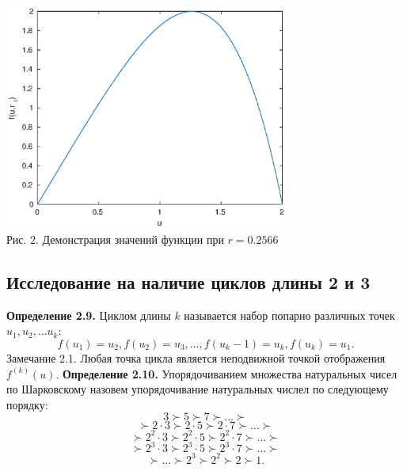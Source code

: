 \documentclass[11pt]{article}
\begin{document}
	\begin{center}
		\includegraphics[width=0.7\textwidth]{lim_r.eps}\\
		{Рис. 2. Демонстрация значений функции при $r = 0.2566$}
	\end{center}
	{\subsection{Исследование на наличие циклов длины 2 и 3}}
	{\textbf{Определение 2.9.} Циклом длины $k$ называется набор попарно различных точек $u_1, u_2,\ldots u_k:$}
	\[f(u_1) = u_2, f(u_2) = u_3, \ldots, f(u_k-1) = u_k, f(u_k) = u_1. \]
	{Замечание 2.1. Любая точка цикла является неподвижной точкой отображения $f^{(k)}(u).$}
	\newline
	{\textbf{Определение 2.10.} Упорядочиванием множества натуральных чисел по Шарковскому назовем упорядочивание натуральных числел по следующему порядку:}
	\[3 \succ 5 \succ 7 \succ \ldots \succ \]
	\[\succ 2\cdot3 \succ 2\cdot5 \succ 2\cdot7 \succ \ldots \succ \]
	\[\succ 2^2\cdot3 \succ 2^2\cdot5 \succ 2^2\cdot7 \succ \ldots \succ \]
	\[\succ 2^3\cdot3 \succ 2^3\cdot5 \succ 2^3\cdot7 \succ \ldots \succ \]
	\[\succ \ldots \succ 2^3 \succ 2^2 \succ 2 \succ 1. \]
	
\end{document}
